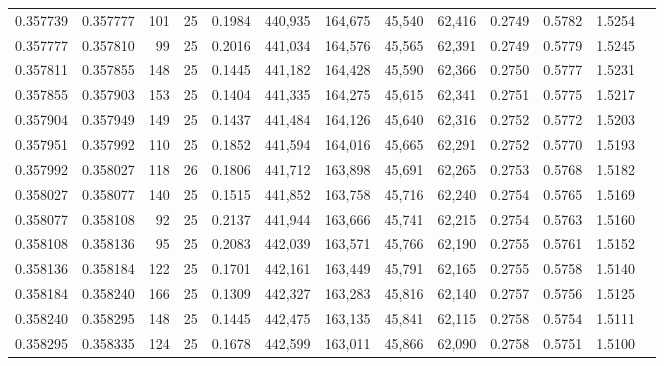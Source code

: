 \begin{tabular}{rrrrrrrrrrrrr}
0.357739 & 0.357777 &   101 &  25 &                                     0.1984 & 440,935 & 164,675 &  45,540 &  62,416 & 0.2749 & 0.5782 & 1.5254 \\
0.357777 & 0.357810 &    99 &  25 &                                     0.2016 & 441,034 & 164,576 &  45,565 &  62,391 & 0.2749 & 0.5779 & 1.5245 \\
0.357811 & 0.357855 &   148 &  25 &                                     0.1445 & 441,182 & 164,428 &  45,590 &  62,366 & 0.2750 & 0.5777 & 1.5231 \\
0.357855 & 0.357903 &   153 &  25 &                                     0.1404 & 441,335 & 164,275 &  45,615 &  62,341 & 0.2751 & 0.5775 & 1.5217 \\
0.357904 & 0.357949 &   149 &  25 &                                     0.1437 & 441,484 & 164,126 &  45,640 &  62,316 & 0.2752 & 0.5772 & 1.5203 \\
0.357951 & 0.357992 &   110 &  25 &                                     0.1852 & 441,594 & 164,016 &  45,665 &  62,291 & 0.2752 & 0.5770 & 1.5193 \\
0.357992 & 0.358027 &   118 &  26 &                                     0.1806 & 441,712 & 163,898 &  45,691 &  62,265 & 0.2753 & 0.5768 & 1.5182 \\
0.358027 & 0.358077 &   140 &  25 &                                     0.1515 & 441,852 & 163,758 &  45,716 &  62,240 & 0.2754 & 0.5765 & 1.5169 \\
0.358077 & 0.358108 &    92 &  25 &                                     0.2137 & 441,944 & 163,666 &  45,741 &  62,215 & 0.2754 & 0.5763 & 1.5160 \\
0.358108 & 0.358136 &    95 &  25 &                                     0.2083 & 442,039 & 163,571 &  45,766 &  62,190 & 0.2755 & 0.5761 & 1.5152 \\
0.358136 & 0.358184 &   122 &  25 &                                     0.1701 & 442,161 & 163,449 &  45,791 &  62,165 & 0.2755 & 0.5758 & 1.5140 \\
0.358184 & 0.358240 &   166 &  25 &                                     0.1309 & 442,327 & 163,283 &  45,816 &  62,140 & 0.2757 & 0.5756 & 1.5125 \\
0.358240 & 0.358295 &   148 &  25 &                                     0.1445 & 442,475 & 163,135 &  45,841 &  62,115 & 0.2758 & 0.5754 & 1.5111 \\
0.358295 & 0.358335 &   124 &  25 &                                     0.1678 & 442,599 & 163,011 &  45,866 &  62,090 & 0.2758 & 0.5751 & 1.5100 \\

\end{tabular}
